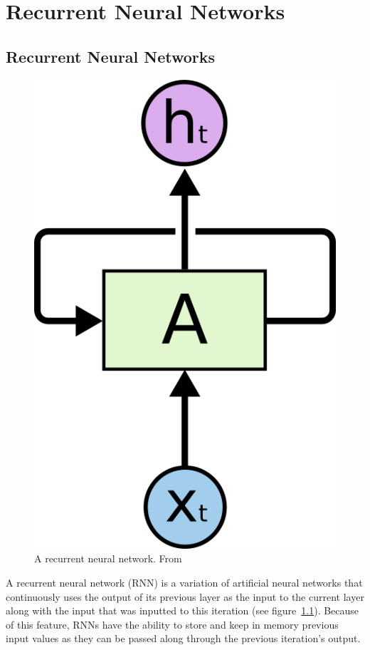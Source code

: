 \chapter{Recurrent Neural Networks}\label{ch:rnn}

\section{Recurrent Neural Networks}
\begin{figure}
	\begin{center}
		\includegraphics[scale=0.5]{rnn/rnn_rolled}
	\end{center}
	\caption{A recurrent neural network. From~\cite{olah2015understanding}\label{fig:rnn_img}}
\end{figure}

A recurrent neural network (RNN) is a variation of artificial neural networks that continuously uses the output of its previous layer as the input to the current layer along with the input that was inputted to this iteration (see figure~\ref{fig:rnn_img}). Because of this feature, RNNs have the ability to store and keep in memory previous input values as they can be passed along through the previous iteration's output. 

